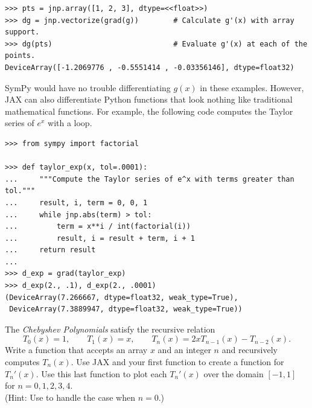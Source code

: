 \begin{lstlisting}
>>> pts = jnp.array([1, 2, 3], dtype=<<float>>)
>>> dg = jnp.vectorize(grad(g))        # Calculate g'(x) with array support.
>>> dg(pts)                            # Evaluate g'(x) at each of the points.
DeviceArray([-1.2069776 , -0.5551414 , -0.03356146], dtype=float32)
\end{lstlisting}



SymPy would have no trouble differentiating $g(x)$ in these examples.
However, JAX can also differentiate Python functions that look nothing like traditional mathematical functions.
For example, the following code computes the Taylor series of $e^{x}$ with a loop.

\begin{lstlisting}
>>> from sympy import factorial

>>> def taylor_exp(x, tol=.0001):
...     """Compute the Taylor series of e^x with terms greater than tol."""
...     result, i, term = 0, 0, 1
...     while jnp.abs(term) > tol:
...         term = x**i / int(factorial(i))
...         result, i = result + term, i + 1
...     return result
...
>>> d_exp = grad(taylor_exp)
>>> d_exp(2., .1), d_exp(2., .0001)
(DeviceArray(7.266667, dtype=float32, weak_type=True),
 DeviceArray(7.3889947, dtype=float32, weak_type=True))
\end{lstlisting}

\begin{problem} %
The \emph{Chebyshev Polynomials} satisfy the recursive relation
\[
T_0(x) = 1,\qquad T_1(x) = x,\qquad T_n(x) = 2xT_{n-1}(x) - T_{n-2}(x).
\]
Write a function that accepts an array $x$ and an integer $n$ and recursively computes $T_n(x)$.
Use JAX and your first function to create a function for $T_n'(x)$.
Use this last function to plot each $T_n'(x)$ over the domain $[-1, 1]$ for $n=0,1,2,3,4$.
\\(Hint: Use  to handle the case when $n = 0$.)
\end{problem}

